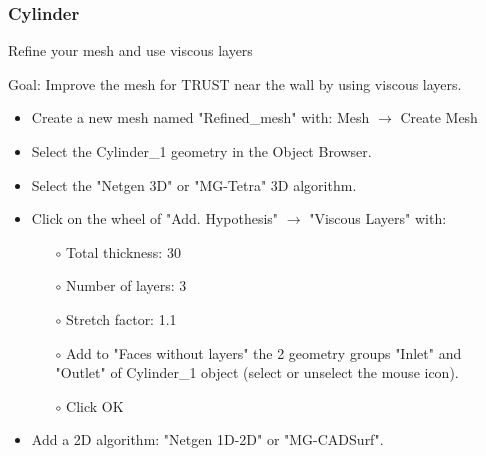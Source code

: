\documentclass[10pt, hyperref={unicode=true,pdfusetitle, bookmarks=true,bookmarksnumbered=false,bookmarksopen=false, breaklinks=false,pdfborder={0 0 1},backref=true,colorlinks=true,linkcolor=darkblue,pageanchor}]{beamer}
\begin{document}
\begin{frame}
\frametitle{Cylinder}
\begin{block}{Refine your mesh and use viscous layers}

Goal: Improve the mesh for TRUST near the wall by using viscous layers.

\begin{itemize}
\item Create a new mesh named "Refined\_mesh" with: Mesh $\rightarrow$ Create Mesh

\item Select the Cylinder\_1 geometry in the Object Browser.

\item Select the "Netgen 3D" or "MG-Tetra" 3D algorithm.

\item Click on the wheel of "Add. Hypothesis" $\rightarrow$ "Viscous Layers" with:
    \begin{itemize}
    \item [$\circ$] Total thickness: 30
    \item [$\circ$] Number of layers: 3
    \item [$\circ$] Stretch factor: 1.1
    \item [$\circ$] Add to "Faces without layers" the 2 geometry groups "Inlet" and "Outlet" of Cylinder\_1 object (select or unselect the mouse icon).
    \item [$\circ$] Click OK
    \end{itemize}

\item Add a 2D algorithm: "Netgen 1D-2D" or "MG-CADSurf".
\end{itemize}

\end{block}
\end{frame}
\end{document}
